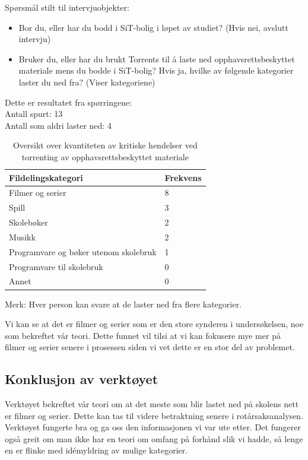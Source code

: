 Spørsmål stilt til intervjuobjekter:
\begin{itemize}
    \item Bor du, eller har du bodd i SiT-bolig i løpet av studiet? (Hvis nei, avslutt intervju)
    \item Bruker du, eller har du brukt Torrents til å laste ned opphavsrettsbeskyttet materiale mens du bodde i SiT-bolig? Hvis ja, hvilke av følgende kategorier laster du ned fra? (Viser kategoriene)
\end{itemize}

\noindent Dette er resultatet fra spørringene: \\
\indent Antall spurt: 13 \\
\indent Antall som aldri laster ned: 4
\begin{table} [H]
    \begin{tabular}{ | m{20em} | m{20em} | }
        \hline
            \cellcolor{yellow} Fildelingskategori & \cellcolor{yellow} Frekvens \\
        \hline
            Filmer og serier & 8  \\
        \hline
            Spill & 3 \\
        \hline
            Skolebøker & 2 \\
        \hline
            Musikk & 2 \\
        \hline
            Programvare og bøker utenom skolebruk & 1 \\
        \hline
            Programvare til skolebruk & 0 \\
        \hline
            Annet & 0 \\
        \hline
    \end{tabular}
    \caption{Oversikt over kvantiteten av kritiske hendelser ved torrenting av opphavsrettsbeskyttet materiale}
    \label{kritisk_tabell_1}
\end{table}

Merk: Hver person kan svare at de laster ned fra flere kategorier.

\noindent Vi kan se at det er filmer og serier som er den store synderen i undersøkelsen, noe som bekreftet vår teori. Dette funnet vil tilsi at vi kan fokusere mye mer på filmer og serier senere i prosessen siden vi vet dette er en stor del av problemet. 

\subsection{Konklusjon av verktøyet}
Verktøyet bekreftet vår teori om at det meste som blir lastet ned på skolens nett er filmer og serier. Dette kan tas til videre betraktning senere i rotårsaksanalysen. Verktøyet fungerte bra og ga oss den informasjonen vi var ute etter. Det fungerer også greit om man ikke har en teori om omfang på forhånd slik vi hadde, så lenge en er flinke med idémyldring av mulige kategorier. 